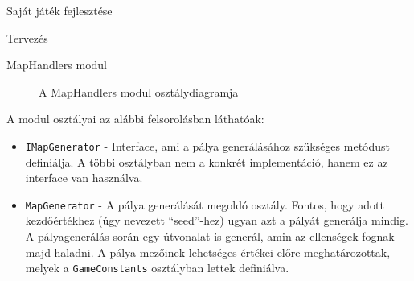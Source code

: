 \begin{MyChapter}{Saját játék fejlesztése}
\begin{MySection}{Tervezés}
\begin{MySubSection}{MapHandlers modul}
			\begin{figure}[h!]
				\centering
				\caption{A MapHandlers modul osztálydiagramja}
				\label{fig:uml:map}
			\end{figure}
			
			A modul osztályai az alábbi felsorolásban láthatóak:
			\begin{itemize}
				\item \texttt{IMapGenerator} - Interface, ami a pálya generálásához szükséges metódust definiálja. A többi osztályban nem a konkrét implementáció, hanem ez az interface van használva.
				
				\item \texttt{MapGenerator} - A pálya generálását megoldó osztály. Fontos, hogy adott kezdőértékhez (úgy nevezett ``seed''-hez) ugyan azt a pályát generálja mindig. A pályagenerálás során egy útvonalat is generál, amin az ellenségek fognak majd haladni. A pálya mezőinek lehetséges értékei előre meghatározottak, melyek a \texttt{GameConstants} osztályban lettek definiálva.
				

\end{itemize}
\end{MySubSection}
\end{MySection}
\end{MyChapter}
